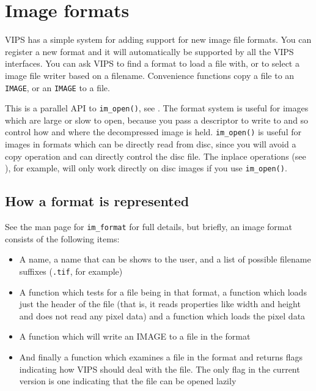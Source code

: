 \section{Image formats}
\label{sec:format}

VIPS has a simple system for adding support for new image file formats. You
can register a new format and it will automatically be supported by all
the VIPS interfaces. You can ask VIPS to find a format to load a file with,
or to select a image file writer based on a filename. Convenience functions
copy a file to an \verb+IMAGE+, or an \verb+IMAGE+ to a file.

This is a parallel API to \verb+im_open()+, see . The
format system is useful for images which are large or slow to open,
because you pass a descriptor to write to and so control how and where
the decompressed image is held. \verb+im_open()+ is useful for images in
formats which can be directly read from disc, since you will avoid a copy
operation and can directly control the disc file. The inplace operations
(see ), for example, will only work directly on disc
images if you use \verb+im_open()+.

\subsection{How a format is represented}

See the man page for \verb+im_format+ for full details, but briefly, an image
format consists of the following items:

\begin{itemize}
\item
A name, a name that can be shows to the user, and a list of possible filename
suffixes (\verb+.tif+, for example)

\item
A function which tests for a file being in that format, a function which loads 
just the header of the file (that is, it reads properties like width and
height and does not read any pixel data) and a function which loads the pixel
data

\item
A function which will write an IMAGE to a file in the format

\item
And finally a function which examines a file in the format and returns flags
indicating how VIPS should deal with the file. The only flag in the current
version is one indicating that the file can be opened lazily

\end{itemize}

